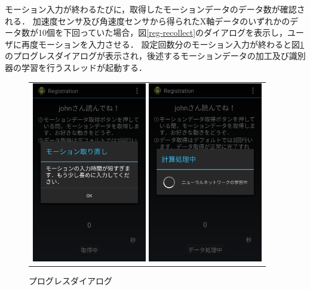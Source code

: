 モーション入力が終わるたびに，取得したモーションデータのデータ数が確認される．
加速度センサ及び角速度センサから得られたX軸データのいずれかのデータ数が10個を下回っていた場合，図\ref{reg-recollect}のダイアログを表示し，ユーザに再度モーションを入力させる．
設定回数分のモーション入力が終わると図\ref{reg-progress}のプログレスダイアログが表示され，後述するモーションデータの加工及び識別器の学習を行うスレッドが起動する．

\begin{figure}[bthp]
  \centering
  \begin{tabular}{c}
    \begin{minipage}{0.5\hsize}
      \centering
      \includegraphics[bb=0 0 1080 1705, width=5cm]{Screenshots/reg-recollect.pdf}
      \caption{データ再入力ダイアログ}
      \label{reg-recollect}
    \end{minipage}
    \begin{minipage}{0.5\hsize}
      \centering
      \includegraphics[bb=0 0 1080 1705, width=5cm]{Screenshots/reg-progress.pdf}
      \caption{プログレスダイアログ}
      \label{reg-progress}
    \end{minipage}
  \end{tabular}
\end{figure}

